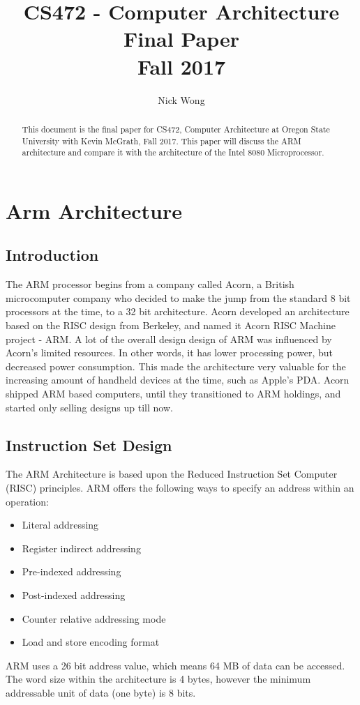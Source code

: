 \documentclass[draftclsnofoot, onecolumn, 10pt, compsoc]{IEEEtran}
\title{\textbf{CS472 - Computer Architecture}\\Final Paper\\Fall 2017}
\author{Nick Wong}
\begin{document}
    \maketitle
    \begin{abstract}
        This document is the final paper for CS472, Computer Architecture at Oregon State University with Kevin McGrath, Fall 2017. This paper will discuss the ARM architecture and compare it with the architecture of the Intel 8080 Microprocessor.
    \end{abstract}
    \newpage
    
    \tableofcontents
    \newpage
    
    \section{Arm Architecture}
        \subsection{Introduction}
            The ARM processor begins from a company called Acorn, a British microcomputer company who decided to make the jump from the standard 8 bit processors at the time, to a 32 bit architecture. Acorn developed an architecture based on the RISC design from Berkeley, and named it Acorn RISC Machine project - ARM. A lot of the overall design design of ARM was influenced by Acorn’s limited resources. In other words, it has lower processing power, but decreased power consumption. This made the architecture very valuable for the increasing amount of handheld devices at the time, such as Apple’s PDA. Acorn shipped ARM based computers, until they transitioned to ARM holdings, and started only selling designs up till now. 
            ~\cite{ARM:All}
            ~\cite{ARM:Timeline}

        \subsection{Instruction Set Design}
            The ARM Architecture is based upon the Reduced Instruction Set Computer (RISC) principles. ARM offers the following ways to specify an address within an operation:
            \begin{itemize}
                \item Literal addressing
                \item Register indirect addressing
                \item Pre-indexed addressing
                \item Post-indexed addressing
                \item Counter relative addressing mode
                \item Load and store encoding format
            \end{itemize}
            ARM uses a 26 bit address value, which means 64 MB of data can be accessed. 
            The word size within the architecture is 4 bytes, however the minimum addressable unit of data (one byte) is 8 bits. 
            ~\cite{ARM:Inside}
            ~\cite{ARM:Addressing}
\end{document}
